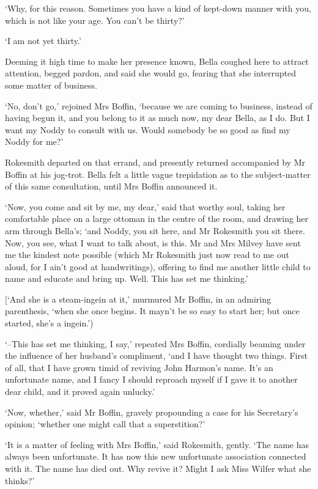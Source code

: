 ‘Why, for this reason. Sometimes you have a kind of kept-down manner
with you, which is not like your age. You can’t be thirty?’

‘I am not yet thirty.’

Deeming it high time to make her presence known, Bella coughed here to
attract attention, begged pardon, and said she would go, fearing that
she interrupted some matter of business.

‘No, don’t go,’ rejoined Mrs Boffin, ‘because we are coming to business,
instead of having begun it, and you belong to it as much now, my dear
Bella, as I do. But I want my Noddy to consult with us. Would somebody
be so good as find my Noddy for me?’

Rokesmith departed on that errand, and presently returned accompanied by
Mr Boffin at his jog-trot. Bella felt a little vague trepidation as to
the subject-matter of this same consultation, until Mrs Boffin announced
it.

‘Now, you come and sit by me, my dear,’ said that worthy soul, taking
her comfortable place on a large ottoman in the centre of the room,
and drawing her arm through Bella’s; ‘and Noddy, you sit here, and Mr
Rokesmith you sit there. Now, you see, what I want to talk about, is
this. Mr and Mrs Milvey have sent me the kindest note possible (which
Mr Rokesmith just now read to me out aloud, for I ain’t good at
handwritings), offering to find me another little child to name and
educate and bring up. Well. This has set me thinking.’

[‘And she is a steam-ingein at it,’ murmured Mr Boffin, in an admiring
parenthesis, ‘when she once begins. It mayn’t be so easy to start her;
but once started, she’s a ingein.’)

‘--This has set me thinking, I say,’ repeated Mrs Boffin, cordially
beaming under the influence of her husband’s compliment, ‘and I have
thought two things. First of all, that I have grown timid of reviving
John Harmon’s name. It’s an unfortunate name, and I fancy I should
reproach myself if I gave it to another dear child, and it proved again
unlucky.’

‘Now, whether,’ said Mr Boffin, gravely propounding a case for his
Secretary’s opinion; ‘whether one might call that a superstition?’

‘It is a matter of feeling with Mrs Boffin,’ said Rokesmith, gently.
‘The name has always been unfortunate. It has now this new unfortunate
association connected with it. The name has died out. Why revive it?
Might I ask Miss Wilfer what she thinks?’

